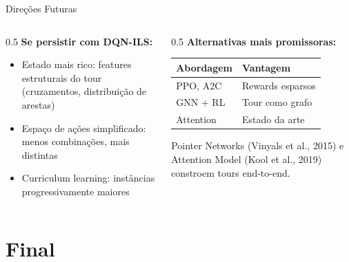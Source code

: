 \documentclass[11pt, xcolor=dvipsnames]{beamer}
\begin{document}
\begin{frame}{Direções Futuras}
  \footnotesize
  \begin{columns}[T]
    \begin{column}{0.5\textwidth}
      \textbf{Se persistir com DQN-ILS:}
      \begin{itemize}
        \item Estado mais rico: features estruturais do tour (cruzamentos, distribuição de arestas)
        \item Espaço de ações simplificado: menos combinações, mais distintas
        \item Curriculum learning: instâncias progressivamente maiores
      \end{itemize}
    \end{column}
    \begin{column}{0.5\textwidth}
      \textbf{Alternativas mais promissoras:}
      \vspace{1mm}

      \centering
      \renewcommand{\arraystretch}{1.15}
      \begin{tabular}{ll}
        \toprule
        \textbf{Abordagem} & \textbf{Vantagem} \\
        \midrule
        PPO, A2C & Rewards esparsos \\
        GNN + RL & Tour como grafo \\
        Attention & Estado da arte \\
        \bottomrule
      \end{tabular}

      \vspace{3mm}
      {\scriptsize Pointer Networks (Vinyals et al., 2015) e Attention Model (Kool et al., 2019) constroem tours end-to-end.}
    \end{column}
  \end{columns}
\end{frame}

\section*{Final}
\end{document}
